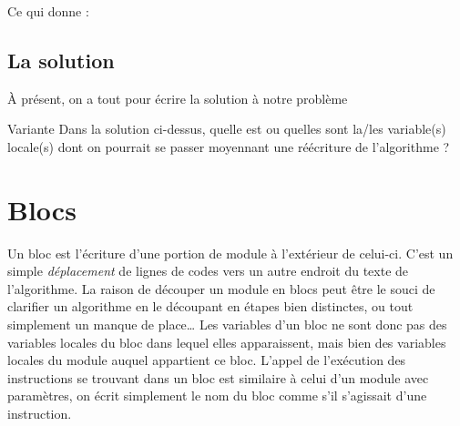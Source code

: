 	Ce qui donne :


\subsection{La solution}

	À présent, on a tout pour écrire la solution à notre problème


	
	\begin{Emphase}[reflexion]{Variante}
		Dans la solution ci-dessus, 
		quelle est ou quelles sont la/les variable(s) locale(s) 
		dont on pourrait se passer moyennant une réécriture de
		l'algorithme ?
	\end{Emphase}
	
\section{Blocs}

	{
	{Un bloc est l’écriture d’une portion de module
	à l’extérieur de celui-ci. C’est un simple
	}{\textit{déplacement}}{
	de lignes de codes vers un autre endroit du texte de
	l'algorithme. La raison de découper un module en blocs
	peut être le souci de clarifier un algorithme en le découpant en étapes
	bien distinctes, ou tout simplement un manque de place… Les variables
	d’un bloc ne sont donc pas des variables locales du bloc dans lequel
	elles apparaissent, mais bien des variables locales du module auquel
	appartient ce bloc. L’appel de l’exécution des instructions se trouvant
	dans un bloc est similaire à celui d’un module avec paramètres, on
	écrit simplement le nom du bloc comme s’il s’agissait d’une
	instruction.}}


